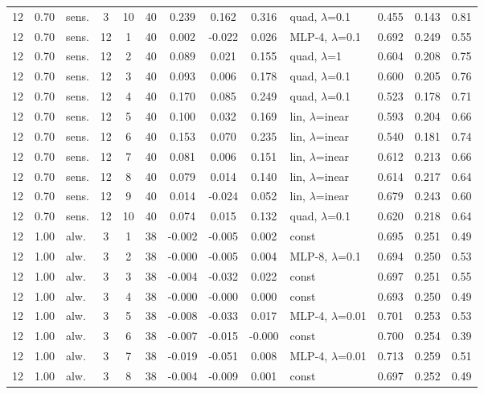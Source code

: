 \begin{scriptsize}
\begin{longtable}{cclcc c ccc l ccc}
12 & 0.70 & sens. & 3 & 10 & 40 & 0.239 & 0.162 & 0.316 & quad, $\lambda$=0.1 & 0.455 & 0.143 & 0.81 \\
12 & 0.70 & sens. & 12 & 1 & 40 & 0.002 & -0.022 & 0.026 & MLP-4, $\lambda$=0.1 & 0.692 & 0.249 & 0.55 \\
12 & 0.70 & sens. & 12 & 2 & 40 & 0.089 & 0.021 & 0.155 & quad, $\lambda$=1 & 0.604 & 0.208 & 0.75 \\
12 & 0.70 & sens. & 12 & 3 & 40 & 0.093 & 0.006 & 0.178 & quad, $\lambda$=0.1 & 0.600 & 0.205 & 0.76 \\
12 & 0.70 & sens. & 12 & 4 & 40 & 0.170 & 0.085 & 0.249 & quad, $\lambda$=0.1 & 0.523 & 0.178 & 0.71 \\
12 & 0.70 & sens. & 12 & 5 & 40 & 0.100 & 0.032 & 0.169 & lin, $\lambda$=inear & 0.593 & 0.204 & 0.66 \\
12 & 0.70 & sens. & 12 & 6 & 40 & 0.153 & 0.070 & 0.235 & lin, $\lambda$=inear & 0.540 & 0.181 & 0.74 \\
12 & 0.70 & sens. & 12 & 7 & 40 & 0.081 & 0.006 & 0.151 & lin, $\lambda$=inear & 0.612 & 0.213 & 0.66 \\
12 & 0.70 & sens. & 12 & 8 & 40 & 0.079 & 0.014 & 0.140 & lin, $\lambda$=inear & 0.614 & 0.217 & 0.64 \\
12 & 0.70 & sens. & 12 & 9 & 40 & 0.014 & -0.024 & 0.052 & lin, $\lambda$=inear & 0.679 & 0.243 & 0.60 \\
12 & 0.70 & sens. & 12 & 10 & 40 & 0.074 & 0.015 & 0.132 & quad, $\lambda$=0.1 & 0.620 & 0.218 & 0.64 \\
12 & 1.00 & alw. & 3 & 1 & 38 & -0.002 & -0.005 & 0.002 & const & 0.695 & 0.251 & 0.49 \\
12 & 1.00 & alw. & 3 & 2 & 38 & -0.000 & -0.005 & 0.004 & MLP-8, $\lambda$=0.1 & 0.694 & 0.250 & 0.53 \\
12 & 1.00 & alw. & 3 & 3 & 38 & -0.004 & -0.032 & 0.022 & const & 0.697 & 0.251 & 0.55 \\
12 & 1.00 & alw. & 3 & 4 & 38 & -0.000 & -0.000 & 0.000 & const & 0.693 & 0.250 & 0.49 \\
12 & 1.00 & alw. & 3 & 5 & 38 & -0.008 & -0.033 & 0.017 & MLP-4, $\lambda$=0.01 & 0.701 & 0.253 & 0.53 \\
12 & 1.00 & alw. & 3 & 6 & 38 & -0.007 & -0.015 & -0.000 & const & 0.700 & 0.254 & 0.39 \\
12 & 1.00 & alw. & 3 & 7 & 38 & -0.019 & -0.051 & 0.008 & MLP-4, $\lambda$=0.01 & 0.713 & 0.259 & 0.51 \\
12 & 1.00 & alw. & 3 & 8 & 38 & -0.004 & -0.009 & 0.001 & const & 0.697 & 0.252 & 0.49 \\

\end{longtable}
\end{scriptsize}
